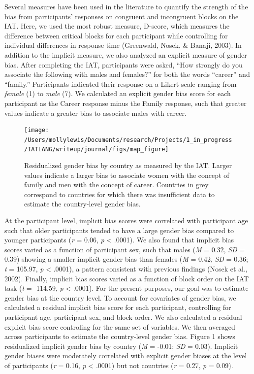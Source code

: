 \documentclass[man,floatsintext]{apa6}
\theoremstyle{definition}
\theoremstyle{definition}
\theoremstyle{definition}
\theoremstyle{remark}
\begin{document}
Several measures have been used in the literature to quantify the
strength of the bias from participants' responses on congruent and
incongruent blocks on the IAT. Here, we used the most robust measure,
D-score, which measures the difference between critical blocks for each
participant while controlling for individual differences in response
time (Greenwald, Nosek, \& Banaji, 2003). In addition to the implicit
measure, we also analyzed an explicit measure of gender bias. After
completing the IAT, participants were asked, \enquote{How strongly do
you associate the following with males and females?} for both the words
\enquote{career} and \enquote{family.} Participants indicated their
response on a Likert scale ranging from \emph{female} (1) to \emph{male}
(7). We calculated an explicit gender bias score for each participant as
the Career response minus the Family response, such that greater values
indicate a greater bias to associate males with career.

\begin{figure}[t]

{\centering \texttt{[image: /Users/mollylewis/Documents/research/Projects/1\_in\_progress/IATLANG/writeup/journal/figs/map\_figure]} 

}

\caption{Residualized gender bias by country as measured by the IAT. Larger values indicate a larger bias to associate women with the concept of family and men with the concept of career. Countries in grey correspond to countries for which there was insufficient data to estimate the country-level gender bias.}\label{fig:mapplot}
\end{figure}

At the participant level, implicit bias scores were correlated with
participant age such that older participants tended to have a large
gender bias compared to younger participants (\emph{r} = 0.06, \emph{p}
\textless{} .0001). We also found that implicit bias scores varied as a
function of participant sex, such that males (\emph{M} = 0.32, \emph{SD}
= 0.39) showing a smaller implicit gender bias than females (\emph{M} =
0.42, \emph{SD} = 0.36; \emph{t} = 105.97, \emph{p} \textless{} .0001),
a pattern consistent with previous findings (Nosek et al., 2002).
Finally, implicit bias scores varied as a function of block order on the
IAT task (\emph{t} = -114.59, \emph{p} \textless{} .0001). For the
present purposes, our goal was to estimate gender bias at the country
level. To account for covariates of gender bias, we calculated a
residual implicit bias score for each participant, controlling for
participant age, participant sex, and block order. We also calculated a
residual explicit bias score controling for the same set of variables.
We then averaged across participants to estimate the country-level
gender bias. Figure 1 shows residualized implicit gender bias by country
(\emph{M} = -0.01; \emph{SD} = 0.03). Implicit gender biases were
moderately correlated with explicit gender biases at the level of
participants (\emph{r} = 0.16, \emph{p} \textless{} .0001) but not
countries (\emph{r} = 0.27, \emph{p} = 0.09).
\end{document}
